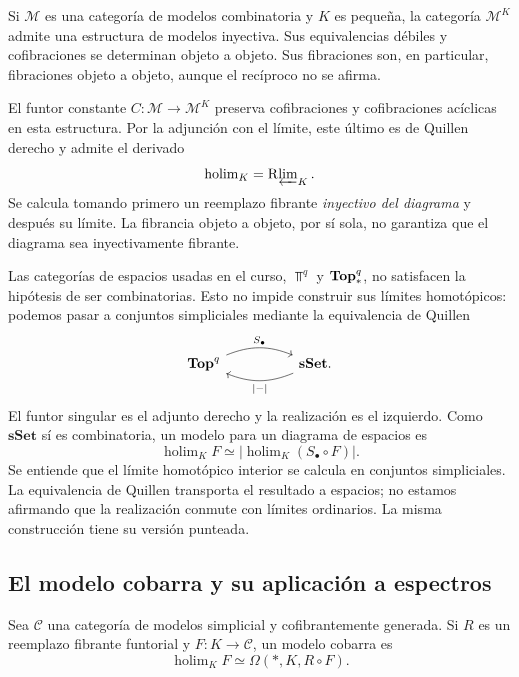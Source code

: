 \begin{teo}
Si $\mathcal M$ es una categoría de modelos combinatoria y $K$ es pequeña, la categoría $\mathcal M^K$ admite una estructura de modelos inyectiva. Sus equivalencias débiles y cofibraciones se determinan objeto a objeto. Sus fibraciones son, en particular, fibraciones objeto a objeto, aunque el recíproco no se afirma.
\end{teo}

El funtor constante $C\colon\mathcal M\to\mathcal M^K$ preserva cofibraciones y cofibraciones acíclicas en esta estructura. Por la adjunción con el límite, este último es de Quillen derecho y admite el derivado
\[
\operatorname{holim}_K=\mathrm R\!\varprojlim\nolimits_K.
\]
Se calcula tomando primero un reemplazo fibrante \emph{inyectivo del diagrama} y después su límite. La fibrancia objeto a objeto, por sí sola, no garantiza que el diagrama sea inyectivamente fibrante.

Las categorías de espacios usadas en el curso, $\Top^q$ y $\mathbf{Top}_*^q$, no satisfacen la hipótesis de ser combinatorias. Esto no impide construir sus límites homotópicos: podemos pasar a conjuntos simpliciales mediante la equivalencia de Quillen
\[
\begin{tikzcd}[column sep=huge]
\Top^q\arrow[r,bend left=22,"S_\bullet"]
&\mathbf{sSet}\arrow[l,bend left=22,"|-|"] .
\end{tikzcd}
\]
El funtor singular es el adjunto derecho y la realización es el izquierdo. Como $\mathbf{sSet}$ sí es combinatoria, un modelo para un diagrama de espacios es
\[
\operatorname{holim}_K F
\simeq\left|\operatorname{holim}_K(S_\bullet\circ F)\right|.
\]
Se entiende que el límite homotópico interior se calcula en conjuntos simpliciales. La equivalencia de Quillen transporta el resultado a espacios; no estamos afirmando que la realización conmute con límites ordinarios. La misma construcción tiene su versión punteada.

\subsection{El modelo cobarra y su aplicación a espectros}

\begin{teo}
Sea $\mathcal C$ una categoría de modelos simplicial y cofibrantemente generada. Si $R$ es un reemplazo fibrante funtorial y $F\colon K\to\mathcal C$, un modelo cobarra es
\[
\operatorname{holim}_K F\simeq\Omega(*,K,R\circ F).
\]
\end{teo}

